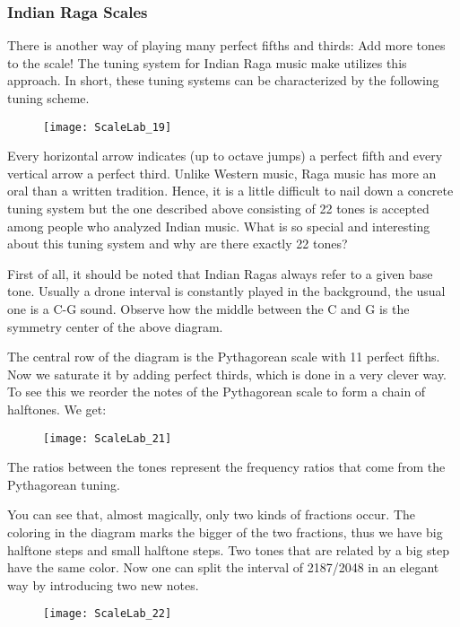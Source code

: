 \subsubsection{Indian Raga Scales}
There is another way of playing many perfect fifths and thirds: Add more tones to the scale!  The tuning system for Indian Raga music make utilizes this approach. In short, these tuning systems can be characterized by the following tuning scheme.

\begin{figure}[h]
\centering
\texttt{[image: ScaleLab\_19]}
\end{figure}


Every horizontal arrow indicates (up to octave jumps) a perfect fifth and every vertical arrow a perfect third. Unlike Western music, Raga music has more an oral than a written tradition. Hence, it is a little difficult to nail down a concrete tuning system but the one described above consisting of 22 tones is accepted among people who analyzed Indian music. What is so special and interesting about this tuning system and why are there exactly 22 tones?

First of all, it should be noted that Indian Ragas always refer to a given base tone. Usually a drone interval is constantly played in the background, the usual one is a C-G sound. Observe how the middle between the C and G is the symmetry center of the above diagram.

The central row of the diagram is the Pythagorean scale with 11 perfect fifths. Now we saturate it by adding perfect thirds, which is done in a very clever way. To see this we reorder the notes of the Pythagorean scale to form a chain of halftones. We get:

\begin{figure}[h]
\centering
\texttt{[image: ScaleLab\_21]}
\end{figure}

The ratios between the tones represent the frequency ratios that come from the Pythagorean tuning.

You can see that, almost magically, only two kinds of fractions occur. The coloring in the diagram marks the bigger of the two fractions, thus we have big halftone steps and small halftone steps. Two tones that are related by a big step have the same color. Now one can split the interval of 2187/2048 in an elegant way by introducing two new notes.

\begin{figure}[h]
\centering
\texttt{[image: ScaleLab\_22]}
\end{figure}

